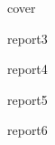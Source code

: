 \documentclass[dvipdfmx,autodetect-engine, 12pt]{jsarticle}
\begin{document}
{cover}


\clearpage

{report3}
\clearpage

{report4}
\clearpage

{report5}
\clearpage

{report6}
\clearpage

\printbibliography[
 title=参考文献
]
\end{document}
